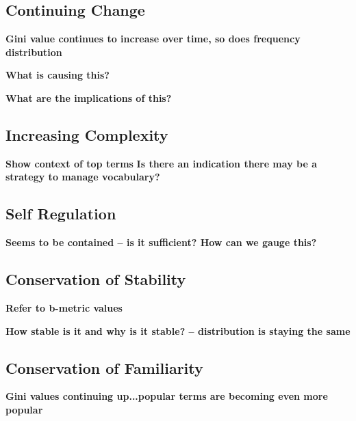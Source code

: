 \subsection{Continuing Change} %
\label{sub:continuing_change}

\textbf{Gini value continues to increase over time, so does frequency distribution}

\textbf{What is causing this?}

\textbf{What are the implications of this?}


\subsection{Increasing Complexity} %
\label{sub:increasing_complexity}

\textbf{Show context of top terms}
\textbf{Is there an indication there may be a strategy to manage vocabulary?}


\subsection{Self Regulation} %
\label{sub:self_regulation}

\textbf{Seems to be contained -- is it sufficient? How can we gauge this?}


\subsection{Conservation of Stability} %
\label{sub:conservation_of_stability}

\textbf{Refer to b-metric values}

\textbf{How stable is it and why is it stable? -- distribution is staying the same}


\subsection{Conservation of Familiarity} %
\label{sub:conservation_of_familiarity}

\textbf{Gini values continuing up...popular terms are becoming even more popular}


